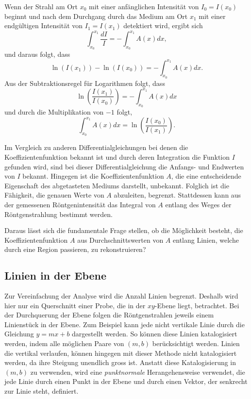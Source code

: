 Wenn der Strahl am Ort $x_0$ mit einer anfänglichen Intensität von $I_0 = I(x_0)$ beginnt und nach dem Durchgang durch das Medium am Ort $x_1$ mit einer endgültigen Intensität von $I_1 = I(x_1)$ detektiert wird, ergibt sich 
\begin{equation}
	\int_{x_0}^{x_1} \dfrac{dI}{I} = -\int_{x_0}^{x_1} A(x)dx,
\end{equation}
und daraus folgt, dass
\begin{equation}
	\ln (I(x_1)) - \ln (I(x_0)) = -\int_{x_0}^{x_1} A(x)dx.
\end{equation}
Aus der Subtraktionsregel für Logarithmen folgt, dass
\begin{equation}
	\ln (\dfrac{I(x_1)}{I(x_0)}) = -\int_{x_0}^{x_1} A(x)dx
\end{equation}
und durch die Multiplikation von $-1$ folgt,
\begin{equation}
	\int_{x_0}^{x_1} A(x)dx = \ln (\dfrac{I(x_0)}{I(x_1)}).
\end{equation}

Im Vergleich zu anderen Differentialgleichungen bei denen die Koeffizientenfunktion bekannt ist und durch deren Integration die Funktion $I$ gefunden wird, sind bei dieser Differentialgleichung die Anfangs- und Endwerten von $I$ bekannt. Hingegen ist die Koeffizientenfunktion $A$, die eine entscheidende Eigenschaft des abgetasteten Mediums darstellt, unbekannt. Folglich ist die Fähigkeit, die genauen Werte von $A$ abzuleiten, begrenzt. Stattdessen kann aus der gemessenen Röntgenintensität das Integral von $A$ entlang des Weges der Röntgenstrahlung bestimmt werden.

Daraus lässt sich die fundamentale Frage stellen, ob die Möglichkeit besteht, die Koeffizientenfunktion $A$ aus Durchschnittswerten von $A$ entlang Linien, welche durch eine Region passieren, zu rekonstruieren?

\subsection{Linien in der Ebene
	\label{ct:subsection:linien}}
Zur Vereinfachung der Analyse wird die Anzahl Linien begrenzt. Deshalb wird hier nur ein Querschnitt einer Probe, die in der $xy$-Ebene liegt, betrachtet. Bei der Durchquerung der Ebene folgen die Röntgenstrahlen jeweils einem Linienstück in der Ebene. Zum Beispiel kann jede nicht vertikale Linie durch die Gleichung $y = mx + b$ dargestellt werden. So können diese Linien katalogisiert werden, indem alle möglichen Paare von $(m, b)$ berücksichtigt werden. Linien die vertikal verlaufen, können hingegen mit dieser Methode nicht katalogisiert werden, da ihre Steigung unendlich gross ist. Anstatt diese Katalogisierung in $(m, b)$ zu verwenden, wird eine \emph{punktnormale} Herangehensweise verwendet, die jede Linie durch einen Punkt in der Ebene und durch einen Vektor, der senkrecht zur Linie steht, definiert.


